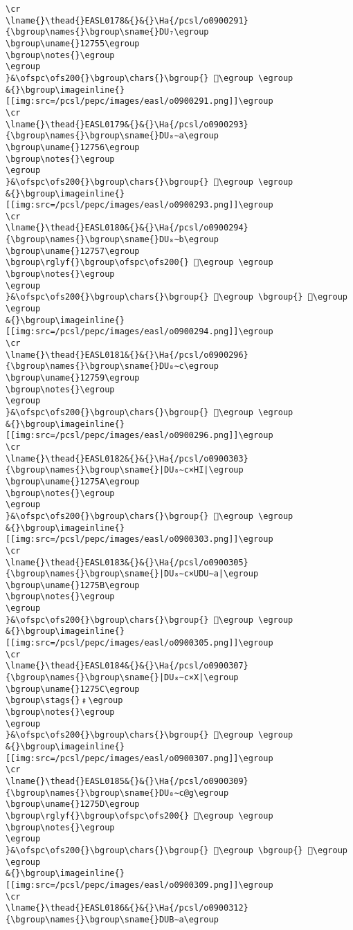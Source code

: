 \begin{verbatim}
\cr
\lname{}\thead{}EASL0178&{}&{}\Ha{/pcsl/o0900291}{\bgroup\names{}\bgroup\sname{}DU₇\egroup
\bgroup\uname{}12755\egroup
\bgroup\notes{}\egroup
\egroup
}&\ofspc\ofs200{}\bgroup\chars{}\bgroup{} 𒝕\egroup \egroup
&{}\bgroup\imageinline{}[[img:src=/pcsl/pepc/images/easl/o0900291.png]]\egroup
\cr
\lname{}\thead{}EASL0179&{}&{}\Ha{/pcsl/o0900293}{\bgroup\names{}\bgroup\sname{}DU₈∼a\egroup
\bgroup\uname{}12756\egroup
\bgroup\notes{}\egroup
\egroup
}&\ofspc\ofs200{}\bgroup\chars{}\bgroup{} 𒝖\egroup \egroup
&{}\bgroup\imageinline{}[[img:src=/pcsl/pepc/images/easl/o0900293.png]]\egroup
\cr
\lname{}\thead{}EASL0180&{}&{}\Ha{/pcsl/o0900294}{\bgroup\names{}\bgroup\sname{}DU₈∼b\egroup
\bgroup\uname{}12757\egroup
\bgroup\rglyf{}\bgroup\ofspc\ofs200{} 𒝗\egroup \egroup
\bgroup\notes{}\egroup
\egroup
}&\ofspc\ofs200{}\bgroup\chars{}\bgroup{} 𒝗\egroup \bgroup{} 𒝘\egroup \egroup
&{}\bgroup\imageinline{}[[img:src=/pcsl/pepc/images/easl/o0900294.png]]\egroup
\cr
\lname{}\thead{}EASL0181&{}&{}\Ha{/pcsl/o0900296}{\bgroup\names{}\bgroup\sname{}DU₈∼c\egroup
\bgroup\uname{}12759\egroup
\bgroup\notes{}\egroup
\egroup
}&\ofspc\ofs200{}\bgroup\chars{}\bgroup{} 𒝙\egroup \egroup
&{}\bgroup\imageinline{}[[img:src=/pcsl/pepc/images/easl/o0900296.png]]\egroup
\cr
\lname{}\thead{}EASL0182&{}&{}\Ha{/pcsl/o0900303}{\bgroup\names{}\bgroup\sname{}|DU₈∼c×HI|\egroup
\bgroup\uname{}1275A\egroup
\bgroup\notes{}\egroup
\egroup
}&\ofspc\ofs200{}\bgroup\chars{}\bgroup{} 𒝚\egroup \egroup
&{}\bgroup\imageinline{}[[img:src=/pcsl/pepc/images/easl/o0900303.png]]\egroup
\cr
\lname{}\thead{}EASL0183&{}&{}\Ha{/pcsl/o0900305}{\bgroup\names{}\bgroup\sname{}|DU₈∼c×UDU∼a|\egroup
\bgroup\uname{}1275B\egroup
\bgroup\notes{}\egroup
\egroup
}&\ofspc\ofs200{}\bgroup\chars{}\bgroup{} 𒝛\egroup \egroup
&{}\bgroup\imageinline{}[[img:src=/pcsl/pepc/images/easl/o0900305.png]]\egroup
\cr
\lname{}\thead{}EASL0184&{}&{}\Ha{/pcsl/o0900307}{\bgroup\names{}\bgroup\sname{}|DU₈∼c×X|\egroup
\bgroup\uname{}1275C\egroup
\bgroup\stags{}﹟\egroup
\bgroup\notes{}\egroup
\egroup
}&\ofspc\ofs200{}\bgroup\chars{}\bgroup{} 𒝜\egroup \egroup
&{}\bgroup\imageinline{}[[img:src=/pcsl/pepc/images/easl/o0900307.png]]\egroup
\cr
\lname{}\thead{}EASL0185&{}&{}\Ha{/pcsl/o0900309}{\bgroup\names{}\bgroup\sname{}DU₈∼c@g\egroup
\bgroup\uname{}1275D\egroup
\bgroup\rglyf{}\bgroup\ofspc\ofs200{} 𒝝\egroup \egroup
\bgroup\notes{}\egroup
\egroup
}&\ofspc\ofs200{}\bgroup\chars{}\bgroup{} 𒝝\egroup \bgroup{} 𒝞\egroup \egroup
&{}\bgroup\imageinline{}[[img:src=/pcsl/pepc/images/easl/o0900309.png]]\egroup
\cr
\lname{}\thead{}EASL0186&{}&{}\Ha{/pcsl/o0900312}{\bgroup\names{}\bgroup\sname{}DUB∼a\egroup

\end{verbatim}
